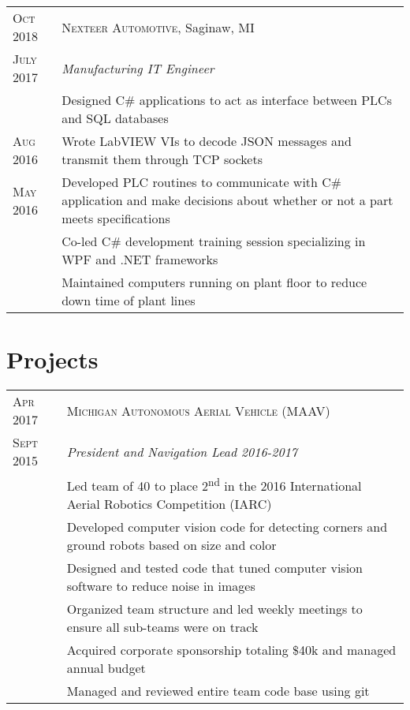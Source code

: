 \documentclass[a4paper,12pt]{article} %
\begin{document}

\begin{tabular}{R{2.1cm}|p{15.5cm}}
\textsc{Oct 2018} & \textsc{Nexteer Automotive}, Saginaw, MI \\
\textsc{July 2017} & \emph{Manufacturing IT Engineer} \\
& \footnotesize{Designed C\# applications to act as interface
  between PLCs and SQL databases} \\
\textsc{Aug 2016} & \footnotesize{Wrote LabVIEW VIs to decode JSON messages
  and transmit them through TCP sockets}\\
\textsc{May 2016} & \footnotesize{Developed PLC routines to communicate with C\#
  application and make decisions about whether or not a part meets
  specifications} \\
& \footnotesize{Co-led C\# development training session specializing in WPF and
 .NET frameworks}\\
& \footnotesize{Maintained computers running on plant floor to reduce down time
  of plant lines} \\
\end{tabular}


\section{Projects}

\begin{tabular}{R{2.1cm}|p{15.5cm}}
\textsc{Apr 2017} & \textsc{Michigan Autonomous Aerial Vehicle (MAAV)} \\
\textsc{Sept 2015} & \emph{President and Navigation Lead 2016-2017} \\
& \footnotesize{Led team of 40 to place 2\textsuperscript{nd} in the 2016
  International Aerial Robotics Competition (IARC)} \\
& \footnotesize{Developed computer vision code for detecting corners and
  ground robots based on size and color} \\
& \footnotesize{Designed and tested code that tuned computer vision software to
  reduce noise in images} \\
& \footnotesize{Organized team structure and led weekly meetings to ensure all
  sub-teams were on track} \\
& \footnotesize{Acquired corporate sponsorship totaling \$40k and managed annual
  budget} \\
& \footnotesize{Managed and reviewed entire team code base using git} \\
\end{tabular}
\end{document}
